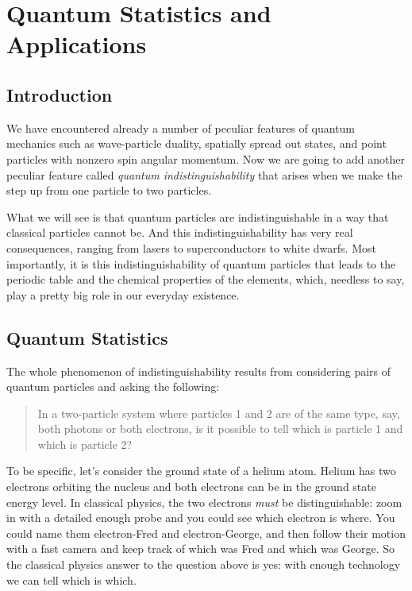 \chapter{Quantum Statistics and Applications}
\label{chapter:quantum_statistics}

\section{Introduction}

We have encountered already a number of peculiar features of quantum
mechanics such as wave-particle duality, spatially spread out states,
and point particles with nonzero spin angular momentum.  Now we are
going to add another peculiar feature called \textit{quantum
  indistinguishability} that arises when we make the step up from
one particle to two particles.

What we will see is that quantum particles are indistinguishable in a
way that classical particles cannot be.  And this indistinguishability
has very real consequences, ranging from lasers to superconductors to
white dwarfs.  Most importantly, it is this indistinguishability of
quantum particles that leads to the periodic table and the chemical
properties of the elements, which, needless to say, play a pretty big
role in our everyday existence.


\section{Quantum Statistics}

The whole phenomenon of indistinguishability results from considering
pairs of quantum particles and asking the following:
\begin{quote}
In a two-particle system where particles 1 and 2 are of the same type,
say, both photons or both electrons, is it possible to tell which is
particle 1 and which is particle 2?
\end{quote}
To be specific, let's consider the ground state of a helium atom.
Helium has two electrons orbiting the nucleus and both electrons can
be in the ground state energy level.  In classical physics, the two
electrons \textit{must} be distinguishable: zoom in with a detailed
enough probe and you could see which electron is where.  You could
name them electron-Fred and electron-George, and then follow their
motion with a fast camera and keep track of which was Fred and which
was George.  So the classical physics answer to the question above is
yes: with enough technology we can tell which is which.

